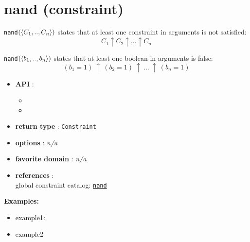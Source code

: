 \label{nand}
\hypertarget{nand}{}

\section{nand (constraint)}\label{nand:nandconstraint}\hypertarget{nand:nandconstraint}{}
\begin{notedef}
  \texttt{nand}$(\langle C_1,..,C_n\rangle)$ states that at least one constraint in arguments is not satisfied:
$$ C_1 \uparrow C_2 \uparrow\ldots\uparrow C_n$$

  \texttt{nand}$(\langle b_1,..,b_n\rangle)$ states that at least one boolean in arguments is false:
$$ (b_1=1)\ \uparrow\ (b_2=1)\ \uparrow\ \ldots\ \uparrow\ (b_n=1)$$
\end{notedef}

\begin{itemize}
\item \textbf{API} : 
\begin{itemize}
\item {}
\item {}
\end{itemize}
\item \textbf{return type} : \texttt{Constraint}
\item \textbf{options} : \emph{n/a}
\item \textbf{favorite domain} : \emph{n/a}
\item \textbf{references} :\\
  global constraint catalog: \href{http://www.emn.fr/z-info/sdemasse/gccat/Cnand.html}{\tt nand}
\end{itemize}

\textbf{Examples:}
\begin{itemize}
	\item example1:
\end{itemize}

\begin{itemize}
	\item example2
\end{itemize}



